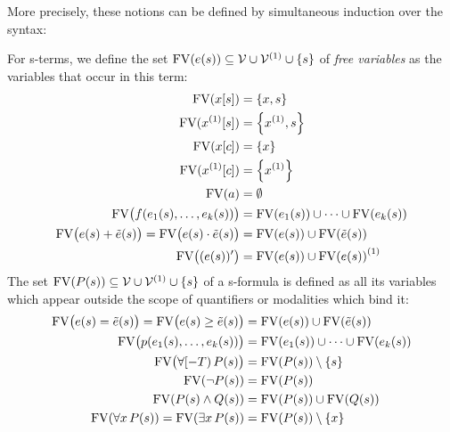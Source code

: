         More precisely, these notions can be defined by simultaneous induction over the syntax:
        \begin{definition}
            For s-terms, we define the set $\freevars{\astrm(s)}\subseteq\allvars\cup\diffvars\cup\set{s}$ of \emph{free variables} as the variables that occur in this term:
            \begin{align*}
                \freevars{\x[s]} &= \set{x,s}\\
                \freevars{\Dx[s]} &= \set{\D{x},s}\\
                \freevars{\x[c]} &= \set{x}\\
                \freevars{\Dx[c]} &= \set{\D{x}}\\
                \freevars{a} &= \emptyset\\
                \freevars[\big]{f(\range{\istrm{1}(s)}{\istrm{k}(s)})} &= \freevars{\istrm{1}(s)} \cup\cdots\cup \freevars{\istrm{k}(s)}\\
                \freevars[\big]{\astrm(s)+\bstrm(s)} = \freevars[\big]{\astrm(s)\cdot\bstrm(s)} &= \freevars{\astrm(s)}\cup\freevars{\bstrm(s)}\\
                \freevars[\big]{\der{\astrm(s)}} &= \freevars{\astrm(s)}\cup\D{\freevars{\astrm(s)}}
            \end{align*}
            The set $\freevars{\asfml(s)}\subseteq\allvars\cup\diffvars\cup\set{s}$ of a s-formula is defined as all its variables which appear outside the scope of quantifiers or modalities which bind it:
            \begin{align*}
                \freevars[\big]{\astrm(s)=\bstrm(s)} = \freevars[\big]{\astrm(s)\geq\bstrm(s)} &= \freevars{\astrm(s)}\cup\freevars{\bstrm(s)}\\
                \freevars[\big]{p(\range{\istrm{1}(s)}{\istrm{k}(s)})} &= \freevars{\istrm{1}(s)} \cup\cdots\cup \freevars{\istrm{k}(s)}\\
                \freevars[\big]{\hs{\asfml(s)}} &= \freevars{\asfml(s)}\setminus\set{s}\\
                \freevars{\lnot\asfml(s)} &= \freevars{\asfml(s)}\\
                \freevars{\asfml(s)\land\bsfml(s)} &= \freevars{\asfml(s)}\cup\freevars{\bsfml(s)}\\
                \freevars{\lforall{x}{\asfml(s)}} = \freevars{\lexists{x}{\asfml(s)}} &= \freevars{\asfml(s)}\setminus\set{x}\\

\end{align*}
\end{definition}
